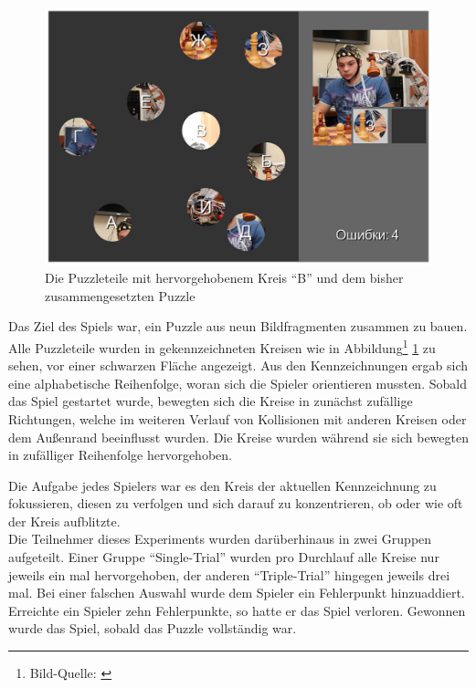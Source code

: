 \begin{figure}[h!]
\begin{center}
\includegraphics[scale=0.33]{images/MovingStimuliPuzzle.png}
\caption{Die Puzzleteile mit hervorgehobenem Kreis "`B"' und dem bisher zusammengesetzten Puzzle}
\label{MovingStimuliPuzzle}
\end{center}
\end{figure}

Das Ziel des Spiels war, ein Puzzle aus neun Bildfragmenten zusammen zu bauen.
Alle Puzzleteile wurden in gekennzeichneten Kreisen wie in Abbildung\footnote[1]{Bild-Quelle: \cite[S.8]{P300Moving}} \ref{MovingStimuliPuzzle} zu sehen, vor einer schwarzen Fläche angezeigt.
Aus den Kennzeichnungen ergab sich eine alphabetische Reihenfolge, woran sich die Spieler orientieren mussten.
Sobald das Spiel gestartet wurde, bewegten sich die Kreise in zunächst zufällige Richtungen, 
welche im weiteren Verlauf von Kollisionen mit anderen Kreisen oder dem Außenrand beeinflusst wurden.
Die Kreise wurden während sie sich bewegten in zufälliger Reihenfolge hervorgehoben.\pagebreak

Die Aufgabe jedes Spielers war es den Kreis der aktuellen Kennzeichnung zu fokussieren, 
diesen zu verfolgen und sich darauf zu konzentrieren, ob oder wie oft der Kreis aufblitzte.\\
Die Teilnehmer dieses Experiments wurden darüberhinaus in zwei Gruppen aufgeteilt.
Einer Gruppe "`Single-Trial"' wurden pro Durchlauf alle Kreise nur jeweils ein mal hervorgehoben, der anderen "`Triple-Trial"' hingegen jeweils drei mal.
Bei einer falschen Auswahl wurde dem Spieler ein Fehlerpunkt hinzuaddiert. Erreichte ein Spieler zehn Fehlerpunkte, so hatte er das Spiel verloren.
Gewonnen wurde das Spiel, sobald das Puzzle vollständig war.\\

